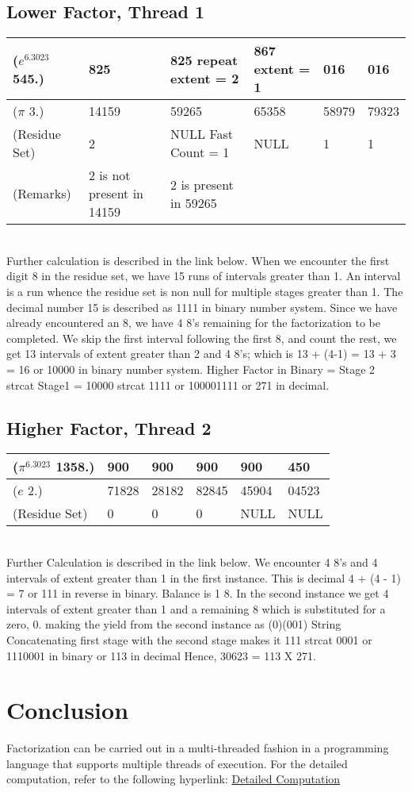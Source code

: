 \documentclass{article}
\begin{document}
\subsection{Lower Factor, Thread 1}
\begin{tabular}{||l|l|l|l|l|l||} \hline\hline
	($e^{6.3023}$ 545.) & 825 & 825 repeat extent = 2 & 867 extent = 1 & 016 & 016 \\ \hline
	($\pi$ 3.) & 14159 & 59265 & 65358 & 58979 & 79323 \\ \hline
	(Residue Set) & 2 & NULL Fast Count = 1 & NULL & 1 & 1 \\ \hline
	(Remarks) & 2 is not present in 14159 & 2 is present in 59265 & & & \\ \hline\hline
\end{tabular} \\
Further calculation is described in the link below. When we encounter the first digit 8 in the residue set, we have 
15 runs of intervals greater than 1. An interval is a run whence the residue set is non null for multiple stages greater than 1.
The decimal number 15 is described as 1111 in binary number system.
Since we have already encountered an 8, we have 4 8's remaining for the factorization to be completed.
We skip the first interval following the first 8, and count the rest, we get 13 intervals of extent greater than 2 and 4 8's; which is 13 + (4-1) = 13 + 3 = 16 or 10000 in binary number system.
Higher Factor in Binary  = Stage 2 strcat Stage1 = 10000 strcat 1111 or 100001111 or 271 in decimal.

\subsection{Higher Factor, Thread 2}
\begin{tabular}{||l|l|l|l|l|l||} \hline\hline
	($\pi^{6.3023}$ 1358.) & 900 & 900 & 900 & 900 & 450 \\ \hline
	($e$ 2.) & 71828 & 28182 & 82845 & 45904 & 04523 \\ \hline
	(Residue Set) & 0 & 0 & 0 & NULL & NULL \\ \hline\hline
\end{tabular} \\
Further Calculation is described in the link below. We encounter 4 8's and 4 intervals of extent greater than 1 in the first instance.
This is decimal 4 + (4 - 1) = 7 or 111 in reverse in binary.
Balance is 1 8.
In the second instance we get 4 intervals of extent greater than 1 and a remaining 8 which is substituted for a zero, 0. making the yield from the second instance as (0)(001)
String Concatenating first stage with the second stage makes it 111 strcat 0001 or 1110001 in binary or 113 in decimal
Hence, 30623 = 113 X 271.

\section{Conclusion}
Factorization can be carried out in a multi-threaded fashion in a programming language that supports multiple threads of execution.
For the detailed computation, refer to the following hyperlink: \href{https://www.dropbox.com/s/8hrsvfw2y9r5f6f/final%20manuscript%202003%2C2022.pdf?dl=0}{Detailed Computation}
\end{document}
